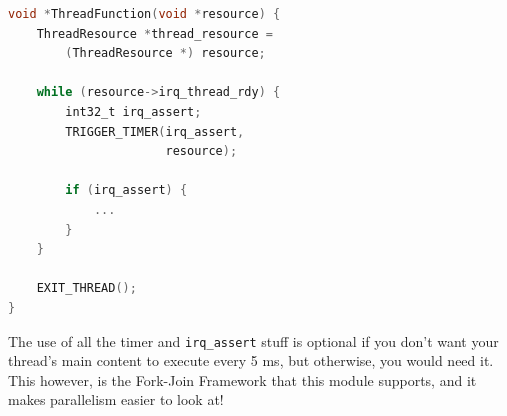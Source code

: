 \documentclass[letterpaper]{article}
\begin{document}
\begin{center}
    \begin{lstlisting}[language=C]
void *ThreadFunction(void *resource) {
    ThreadResource *thread_resource =
        (ThreadResource *) resource;

    while (resource->irq_thread_rdy) {
        int32_t irq_assert;
        TRIGGER_TIMER(irq_assert,
                      resource);

        if (irq_assert) {
            ...
        }
    }

    EXIT_THREAD();
}
    \end{lstlisting}
\end{center}

The use of all the timer and \texttt{irq\_assert} stuff is optional if you don't want your thread's main content to execute every 5 ms, but otherwise, you would need it. This however, is the Fork-Join Framework that this module supports, and it makes parallelism easier to look at!

\newpage
\end{document}
